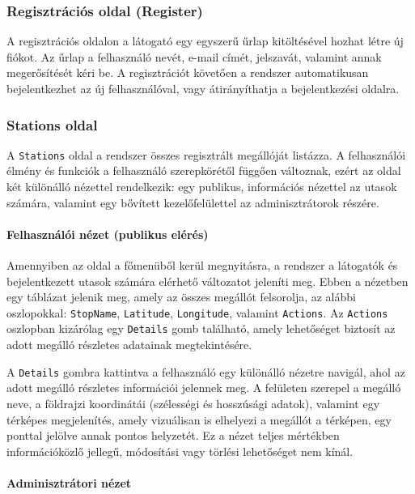 \subsubsection{Regisztrációs oldal (Register)}

A regisztrációs oldalon a látogató egy egyszerű űrlap kitöltésével hozhat létre új fiókot. Az űrlap a felhasználó nevét, e-mail címét, jelszavát, valamint annak megerősítését kéri be. A regisztrációt követően a rendszer automatikusan bejelentkezhet az új felhasználóval, vagy átirányíthatja a bejelentkezési oldalra.

\subsubsection{Stations oldal}

A \texttt{Stations} oldal a rendszer összes regisztrált megállóját listázza. A felhasználói élmény és funkciók a felhasználó szerepkörétől függően változnak, ezért az oldal két különálló nézettel rendelkezik: egy publikus, információs nézettel az utasok számára, valamint egy bővített kezelőfelülettel az adminisztrátorok részére.

\paragraph{Felhasználói nézet (publikus elérés)}

Amennyiben az oldal a főmenüből kerül megnyitásra, a rendszer a látogatók és bejelentkezett utasok számára elérhető változatot jeleníti meg. Ebben a nézetben egy táblázat jelenik meg, amely az összes megállót felsorolja, az alábbi oszlopokkal: \texttt{StopName}, \texttt{Latitude}, \texttt{Longitude}, valamint \texttt{Actions}. Az \texttt{Actions} oszlopban kizárólag egy \texttt{Details} gomb található, amely lehetőséget biztosít az adott megálló részletes adatainak megtekintésére.

A \texttt{Details} gombra kattintva a felhasználó egy különálló nézetre navigál, ahol az adott megálló részletes információi jelennek meg. A felületen szerepel a megálló neve, a földrajzi koordinátái (szélességi és hosszúsági adatok), valamint egy térképes megjelenítés, amely vizuálisan is elhelyezi a megállót a térképen, egy ponttal jelölve annak pontos helyzetét. Ez a nézet teljes mértékben információközlő jellegű, módosítási vagy törlési lehetőséget nem kínál.

\paragraph{Adminisztrátori nézet}

